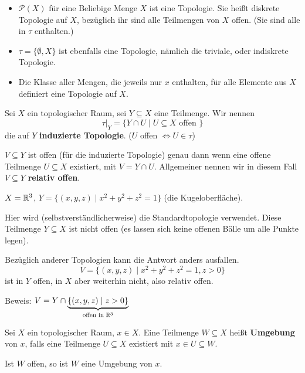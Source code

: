\documentclass[main.tex]{subfiles}
\begin{document}
\begin{Beispiel}
  \begin{itemize}
    \item $\mathcal{P}(X)$ für eine Beliebige Menge $X$ ist eine Topologie. Sie heißt diskrete Topologie auf $X$, bezüglich ihr sind alle Teilmengen von $X$ offen. (Sie sind alle in $\tau$ enthalten.)
    \item $\tau = \{\emptyset,X\}$ ist ebenfalls eine Topologie, nämlich die triviale, oder indiskrete Topologie.
    \item Die Klasse aller Mengen, die jeweils nur $x$ enthalten, für alle Elemente aus $X$ definiert eine Topologie auf $X$.
  \end{itemize}
\end{Beispiel}

\begin{Definition}
  Sei $X$ ein topologischer Raum, sei $Y \subseteq X$ eine Teilmenge. Wir nennen
  $$\tau|_Y = \{Y \cap U \mid U \subseteq X \text{ offen }\}$$
  die auf $Y$ \textbf{induzierte Topologie}. ($U$ offen $\Leftrightarrow U \in \tau$)

  $V \subseteq Y$ ist offen (für die induzierte Topologie) genau dann wenn eine offene Teilmenge $U \subseteq X$ existiert, mit $V = Y \cap U$. Allgemeiner nennen wir in diesem Fall $V \subseteq Y$ \textbf{relativ offen}.
\end{Definition}

\begin{Beispiel}
  $X = \mathbb{R}^3$, $Y = \{(x,y,z) \mid x^2 + y^2 + z^2 = 1 \}$ (die Kugeloberfläche).

  Hier wird (selbstverständlicherweise) die Standardtopologie verwendet. Diese Teilmenge $Y \subseteq X$ ist nicht offen (es lassen sich keine offenen Bälle um alle Punkte legen).

  Bezüglich anderer Topologien kann die Antwort anders ausfallen.
  $$V = \{(x,y,z) \mid x^2 + y^2 + z^2 = 1, z > 0 \}$$
  ist in $Y$ offen, in $X$ aber weiterhin nicht, also relativ offen.

  Beweis: $V = Y \cap \underbrace{\{(x,y,z) \mid z > 0\}}_{\text{offen in } \mathbb{R}^3}$
\end{Beispiel}

\begin{Definition}[Umgebung]
  Sei $X$ ein topologischer Raum, $x \in X$. Eine Teilmenge $W \subseteq X$ heißt \textbf{Umgebung} von $x$, falls eine Teilmenge $U \subseteq X$ existiert mit $x \in U \subseteq W$.

  Ist $W$ offen, so ist $W$ eine Umgebung von $x$.
\end{Definition}
\end{document}
